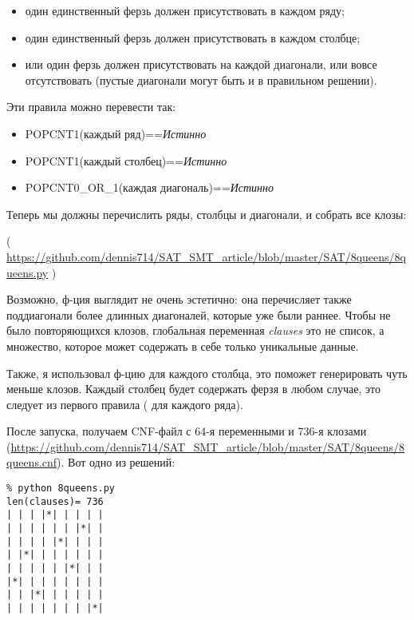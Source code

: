 \begin{itemize}
\item один единственный ферзь должен присутствовать в каждом ряду;

\item один единственный ферзь должен присутствовать в каждом столбце;

\item или один ферзь должен присутствовать на каждой диагонали, или вовсе отсутствовать (пустые диагонали могут быть
и в правильном решении).
\end{itemize}

Эти правила можно перевести так:

\begin{itemize}
\item POPCNT1(каждый ряд)==\textit{Истинно}

\item POPCNT1(каждый столбец)==\textit{Истинно}

\item POPCNT0\_OR\_1(каждая диагональ)==\textit{Истинно}
\end{itemize}

Теперь мы должны перечислить ряды, столбцы и диагонали, и собрать все клозы:


( \url{https://github.com/dennis714/SAT_SMT_article/blob/master/SAT/8queens/8queens.py} )

Возможно, ф-ция  выглядит не очень эстетично:
она перечисляет также поддиагонали более длинных диагоналей, которые уже были раннее.
Чтобы не было повторяющихся клозов, глобальная переменная \textit{clauses} это не список, а множество,
которое может содержать в себе только уникальные данные.

Также, я использовал ф-цию  для каждого столбца, это поможет генерировать чуть меньше клозов.
Каждый столбец будет содержать ферзя в любом случае, это следует из первого правила ( для каждого ряда).

После запуска, получаем CNF-файл с 64-я переменными и 736-я клозами (\url{https://github.com/dennis714/SAT_SMT_article/blob/master/SAT/8queens/8queens.cnf}).
Вот одно из решений:

\begin{lstlisting}
% python 8queens.py
len(clauses)= 736
| | | |*| | | | |
| | | | | | |*| |
| | | | |*| | | |
| |*| | | | | | |
| | | | | |*| | |
|*| | | | | | | |
| | |*| | | | | |
| | | | | | | |*|
\end{lstlisting}

